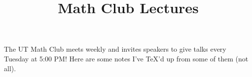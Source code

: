 \documentclass{scrartcl}
\title{Math Club Lectures}
\date{}
\begin{document}
\maketitle
The UT Math Club meets weekly and invites speakers to give talks every Tuesday at 5:00 PM! Here are some notes I've \TeX{}'d up from some of them (not all).
\tableofcontents
    
\end{document}
